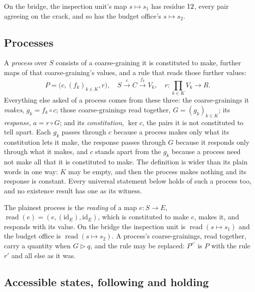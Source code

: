 \documentclass[11pt]{amsart}
\DeclareMathOperator{\readop}{read}
\newcommand{\id}{\mathrm{id}}
\theoremstyle{plain}
\begin{document}
On the bridge, the inspection unit's map $s\mapsto s_1$ has residue $12$, every pair agreeing on the crack, and so has the budget office's $s\mapsto s_2$.

\subsection{Processes}

A \emph{process} over $S$ consists of a coarse-graining it is constituted to make, further maps of that coarse-graining's values, and a rule that reads those further values:
\begin{equation}\label{eq:process}
  P=\bigl(c,(f_k)_{k\in K},r\bigr),\quad S\xrightarrow{\ c\ }C\xrightarrow{\ f_k\ }V_k,\quad r:\prod_{k\in K}V_k\to R.
\end{equation}
Everything else asked of a process comes from these three: the coarse-grainings it \emph{makes}, $g_k=f_k\circ c$; those coarse-grainings read together, $G=(g_k)_{k\in K}$; its \emph{response}, $a=r\circ G$; and its \emph{constitution}, $\ker c$, the pairs it is not constituted to tell apart. Each $g_k$ passes through $c$ because a process makes only what its constitution lets it make, the response passes through $G$ because it responds only through what it makes, and $c$ stands apart from the $g_k$ because a process need not make all that it is constituted to make. The definition is wider than its plain words in one way: $K$ may be empty, and then the process makes nothing and its response is constant. Every universal statement below holds of such a process too, and no existence result has one as its witness.

The plainest process is the \emph{reading} of a map $e:S\to E$, $\readop(e)=(e,(\id_E),\id_E)$, which is constituted to make $e$, makes it, and responds with its value. On the bridge the inspection unit is $\readop(s\mapsto s_1)$ and the budget office is $\readop(s\mapsto s_2)$. A process's coarse-grainings, read together, carry a quantity when $G\rhd q$, and the rule may be replaced: $P^{r'}$ is $P$ with the rule $r'$ and all else as it was.

\subsection{Accessible states, following and holding}
\end{document}
